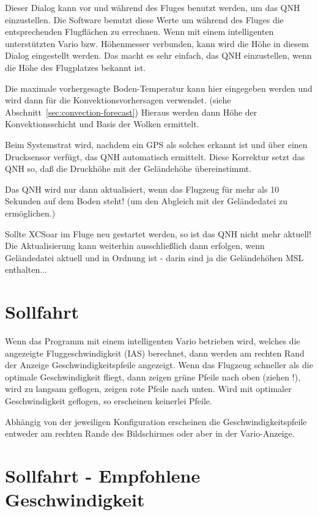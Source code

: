 Dieser Dialog kann vor und während des Fluges benutzt werden, um das QNH einzustellen.
Die Software benutzt diese Werte um während des Fluges die entsprechenden Flugflächen
zu errechnen. Wenn mit einem intelligenten unterstützten Vario bzw. Höhenmesser verbunden,
kann wird die Höhe in diesem Dialog eingestellt werden. Das macht es sehr einfach,
das QNH einzustellen, wenn die Höhe des Flugplatzes bekannt ist.


Die maximale vorhergesagte Boden-Temperatur kann hier eingegeben werden und wird dann für die
Konvektionsvorhersagen verwendet. (siehe Abschnitt~\ref{sec:convection-forecast})
Hieraus werden dann Höhe der Konvektionsschicht und Basis der Wolken ermittelt.


Beim Systemstrat wird, nachdem ein GPS als solches erkannt ist und über einen Drucksensor verfügt,
das QNH automatisch ermittelt.  Diese Korrektur setzt das QNH so, daß die Druckhöhe mit der
Geländehöhe übereinstimmt.

Das QNH wird nur dann aktualisiert, wenn das Flugzeug für mehr als 10 Sekunden auf dem Boden
steht! (um den Abgleich mit der Geländedatei zu ermöglichen.)

Sollte \textsf{XCSoar} im Fluge neu gestartet werden, so ist das QNH nicht mehr aktuell! 
Die Aktualisierung kann weiterhin ausschließlich dann erfolgen, wenn Geländedatei aktuell und in
Ordnung ist - darin sind ja die Geländehöhen MSL enthalten...

\section{Sollfahrt}

Wenn das Programm mit einem intelligenten Vario betrieben wird, welches die angezeigte
Fluggeschwindigkeit (IAS) berechnet, dann werden am rechten Rand der Anzeige Geschwindigkeitspfeile
angezeigt. Wenn das Flugzeug schneller als die optimale Geschwindigkeit fliegt, dann zeigen grüne Pfeile
nach oben (ziehen !), wird zu langsam geflogen, zeigen rote Pfeile nach unten. Wird mit optimaler
Geschwindigkeit geflogen, so erscheinen keinerlei Pfeile.


Abhängig von der jeweiligen Konfiguration erscheinen die Geschwindigkeitspfeile entweder
am rechten Rande des Bildschirmes oder aber in der Vario-Anzeige.

\section{Sollfahrt - Empfohlene Geschwindigkeit}


